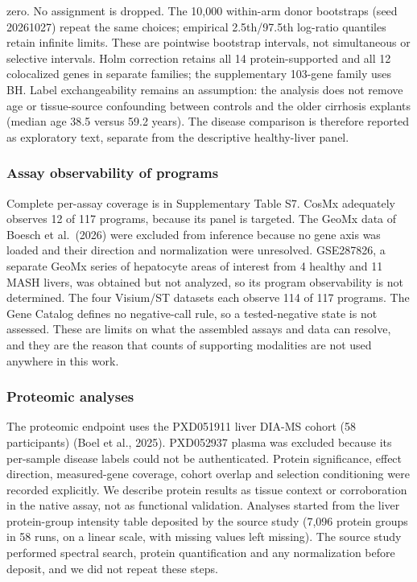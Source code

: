 zero. No assignment is dropped. The 10,000 within-arm donor bootstraps (seed 20261027) repeat the same choices; empirical 2.5th/97.5th log-ratio quantiles retain infinite limits. These are pointwise bootstrap intervals, not simultaneous or selective intervals. Holm correction retains all 14 protein-supported and all 12 colocalized genes in separate families; the supplementary 103-gene family uses BH. Label exchangeability remains an assumption: the analysis does not remove age or tissue-source confounding between controls and the older cirrhosis explants (median age 38.5 versus 59.2 years). The disease comparison is therefore reported as exploratory text, separate from the descriptive healthy-liver panel.

\subsubsection{Assay observability of programs}\label{assay-observability-of-programs}

Complete per-assay coverage is in Supplementary Table S7. CosMx adequately observes 12 of 117 programs, because its panel is targeted. The GeoMx data of Boesch et al.~(2026) were excluded from inference because no gene axis was loaded and their direction and normalization were unresolved. GSE287826, a separate GeoMx series of hepatocyte areas of interest from 4 healthy and 11 MASH livers, was obtained but not analyzed, so its program observability is not determined. The four Visium/ST datasets each observe 114 of 117 programs. The Gene Catalog defines no negative-call rule, so a tested-negative state is not assessed. These are limits on what the assembled assays and data can resolve, and they are the reason that counts of supporting modalities are not used anywhere in this work.

\subsubsection{Proteomic analyses}\label{proteomic-analyses}

The proteomic endpoint uses the PXD051911 liver DIA-MS cohort (58 participants) (Boel et al., 2025). PXD052937 plasma was excluded because its per-sample disease labels could not be authenticated. Protein significance, effect direction, measured-gene coverage, cohort overlap and selection conditioning were recorded explicitly. We describe protein results as tissue context or corroboration in the native assay, not as functional validation. Analyses started from the liver protein-group intensity table deposited by the source study (7,096 protein groups in 58 runs, on a linear scale, with missing values left missing). The source study performed spectral search, protein quantification and any normalization before deposit, and we did not repeat these steps.


